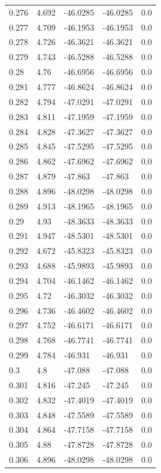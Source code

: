 \begin{table}[H]
\begin{tabular}{lllll}
0.276 & 4.692 & -46.0285 & -46.0285 & 0.0 \\
0.277 & 4.709 & -46.1953 & -46.1953 & 0.0 \\
0.278 & 4.726 & -46.3621 & -46.3621 & 0.0 \\
0.279 & 4.743 & -46.5288 & -46.5288 & 0.0 \\
0.28 & 4.76 & -46.6956 & -46.6956 & 0.0 \\
0.281 & 4.777 & -46.8624 & -46.8624 & 0.0 \\
0.282 & 4.794 & -47.0291 & -47.0291 & 0.0 \\
0.283 & 4.811 & -47.1959 & -47.1959 & 0.0 \\
0.284 & 4.828 & -47.3627 & -47.3627 & 0.0 \\
0.285 & 4.845 & -47.5295 & -47.5295 & 0.0 \\
0.286 & 4.862 & -47.6962 & -47.6962 & 0.0 \\
0.287 & 4.879 & -47.863 & -47.863 & 0.0 \\
0.288 & 4.896 & -48.0298 & -48.0298 & 0.0 \\
0.289 & 4.913 & -48.1965 & -48.1965 & 0.0 \\
0.29 & 4.93 & -48.3633 & -48.3633 & 0.0 \\
0.291 & 4.947 & -48.5301 & -48.5301 & 0.0 \\
0.292 & 4.672 & -45.8323 & -45.8323 & 0.0 \\
0.293 & 4.688 & -45.9893 & -45.9893 & 0.0 \\
0.294 & 4.704 & -46.1462 & -46.1462 & 0.0 \\
0.295 & 4.72 & -46.3032 & -46.3032 & 0.0 \\
0.296 & 4.736 & -46.4602 & -46.4602 & 0.0 \\
0.297 & 4.752 & -46.6171 & -46.6171 & 0.0 \\
0.298 & 4.768 & -46.7741 & -46.7741 & 0.0 \\
0.299 & 4.784 & -46.931 & -46.931 & 0.0 \\
0.3 & 4.8 & -47.088 & -47.088 & 0.0 \\
0.301 & 4.816 & -47.245 & -47.245 & 0.0 \\
0.302 & 4.832 & -47.4019 & -47.4019 & 0.0 \\
0.303 & 4.848 & -47.5589 & -47.5589 & 0.0 \\
0.304 & 4.864 & -47.7158 & -47.7158 & 0.0 \\
0.305 & 4.88 & -47.8728 & -47.8728 & 0.0 \\
0.306 & 4.896 & -48.0298 & -48.0298 & 0.0 \\

\end{tabular}
\end{table}
